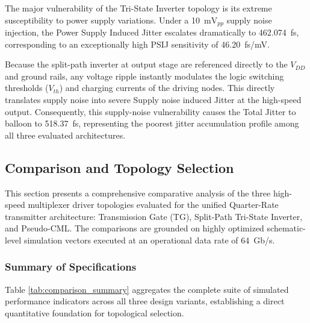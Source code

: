 The major vulnerability of the Tri-State Inverter topology is its extreme susceptibility to power supply variations. Under a 10~$\text{mV}_{pp}$ supply noise injection, the Power Supply Induced Jitter escalates dramatically to 462.074~fs, corresponding to an exceptionally high PSIJ sensitivity of 46.20~fs/mV. 

Because the split-path inverter at output stage are referenced directly to the $V_{DD}$ and ground rails, any voltage ripple instantly modulates the logic switching thresholds ($V_{th}$) and charging currents of the driving nodes. This directly translates supply noise into severe Supply noise induced Jitter at the high-speed output. Consequently, this supply-noise vulnerability causes the Total Jitter to balloon to 518.37~fs, representing the poorest jitter accumulation profile among all three evaluated architectures.

\subsection{Comparison and Topology Selection}
\label{subsec:topology_comparison}

This section presents a comprehensive comparative analysis of the three high-speed multiplexer driver topologies evaluated for the unified Quarter-Rate transmitter architecture: Transmission Gate (TG), Split-Path Tri-State Inverter, and Pseudo-CML. The comparisons are grounded on highly optimized schematic-level simulation vectors executed at an operational data rate of 64~Gb/s.

\subsubsection*{Summary of Specifications}

Table \ref{tab:comparison_summary} aggregates the complete suite of simulated performance indicators across all three design variants, establishing a direct quantitative foundation for topological selection.

